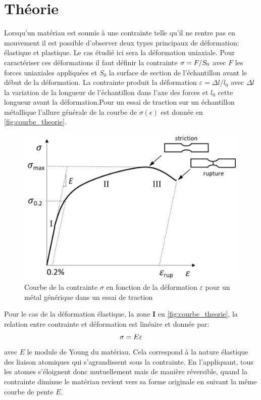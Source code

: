 \section{Théorie}
\label{sec:theorie}
Lorsqu'un matériau est soumis à une contrainte telle qu'il ne rentre pas en mouvement il est possible d'observer deux types principaux de déformation: élastique et plastique. Le cas étudié ici sera la déformation uniaxiale. Pour caractériser ces déformations il faut définir la contrainte $\sigma = F/S_0$ avec $F$ les forces uniaxiales appliquées et $S_0$ la surface de section de l'échantillon avant le début de la déformation. La contrainte produit la déformation $\varepsilon = \Delta l / l_0$ avec $\Delta l$ la variation de la longueur de l'échantillon dans l'axe des forces et $l_0$ cette longueur avant la déformation.Pour un essai de traction sur un échantillon métallique l'allure générale de la courbe de $\sigma(\epsilon)$ est donnée en \autoref{fig:courbe_theorie}.
\begin{figure}[h]
    \centering
    \includegraphics[width=0.6\linewidth]{figures/courbe_traction.png}
    \caption{Courbe de la contrainte $\sigma$ en fonction de la déformation $\varepsilon$ pour un métal générique dans un essai de traction \cite{notice}}
    \label{fig:courbe_theorie}
\end{figure}

Pour le cas de la déformation élastique, la zone $\mathbf{I}$ en \autoref{fig:courbe_theorie}, la relation entre contrainte et déformation est linéaire et donnée par:
\begin{equation}
    \sigma = E \varepsilon
\end{equation}
avec $E$ le module de Young du matériau. Cela correspond à la nature élastique des liaison atomiques qui s'agrandissent sous la contrainte. En l'appliquant, tous les atomes s'éloignent donc mutuellement mais de manière réversible, quand la contrainte diminue le matériau revient vers sa forme originale en suivant la même courbe de pente $E$.

